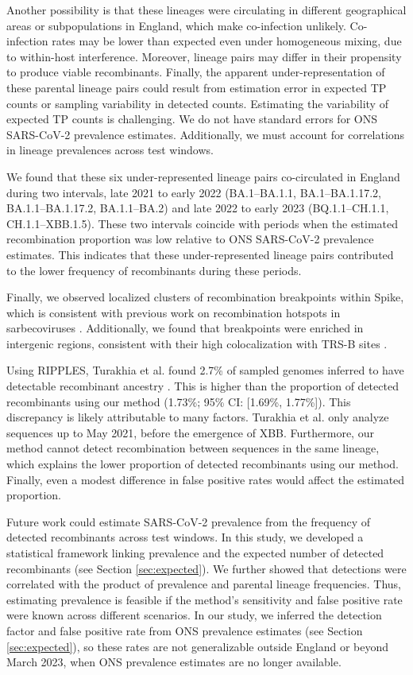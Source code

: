 \documentclass[11pt,oneside,letterpaper]{article}
\begin{document}
Another possibility is that these lineages were circulating in different geographical areas or subpopulations in England, which make co-infection unlikely. Co-infection rates may be lower than expected even under homogeneous mixing, due to within-host interference. Moreover, lineage pairs may differ in their propensity to produce viable recombinants. Finally, the apparent under-representation of these parental lineage pairs could result from estimation error in expected TP counts or sampling variability in detected counts. Estimating the variability of expected TP counts is challenging. We do not have standard errors for ONS SARS-CoV-2 prevalence estimates. Additionally, we must account for correlations in lineage prevalences across test windows. 

We found that these six under-represented lineage pairs co-circulated in England during two intervals, late 2021 to early 2022 (BA.1--BA.1.1, BA.1--BA.1.17.2, BA.1.1--BA.1.17.2, BA.1.1--BA.2) and late 2022 to early 2023 (BQ.1.1--CH.1.1, CH.1.1--XBB.1.5). These two intervals coincide with periods when the estimated recombination proportion was low relative to ONS SARS-CoV-2 prevalence estimates. This indicates that these under-represented lineage pairs contributed to the lower frequency of recombinants during these periods. 

Finally, we observed localized clusters of recombination breakpoints within Spike, which is consistent with previous work on recombination hotspots in sarbecoviruses \cite{lytras_exploring_2022}. 
Additionally, we found that breakpoints were enriched in intergenic regions, consistent with their high colocalization with TRS-B sites \cite{yang_characterizing_2021}.

Using RIPPLES, Turakhia et al. found 2.7\% of sampled genomes inferred to have detectable recombinant ancestry \cite{turakhia_pandemic-scale_2022}. This is higher than the proportion of detected recombinants using our method (1.73\%; 95\% CI: [1.69\%, 1.77\%]). This discrepancy is likely attributable to many factors. Turakhia et al. only analyze sequences up to May 2021, before the emergence of XBB. Furthermore, our method cannot detect recombination between sequences in the same lineage, which explains the lower proportion of detected recombinants using our method. Finally, even a modest difference in false positive rates would affect the estimated proportion.

Future work could estimate SARS-CoV-2 prevalence from the frequency of detected recombinants across test windows. In this study, we developed a statistical framework linking prevalence and the expected number of detected recombinants (see Section \ref{sec:expected}). We further showed that detections were correlated with the product of prevalence and parental lineage frequencies. Thus, estimating prevalence is feasible if the method’s sensitivity and false positive rate were known across different scenarios. In our study, we inferred the detection factor and false positive rate from ONS prevalence estimates (see Section \ref{sec:expected}), so these rates are not generalizable outside England or beyond March 2023, when ONS prevalence estimates are no longer available.
\end{document}
